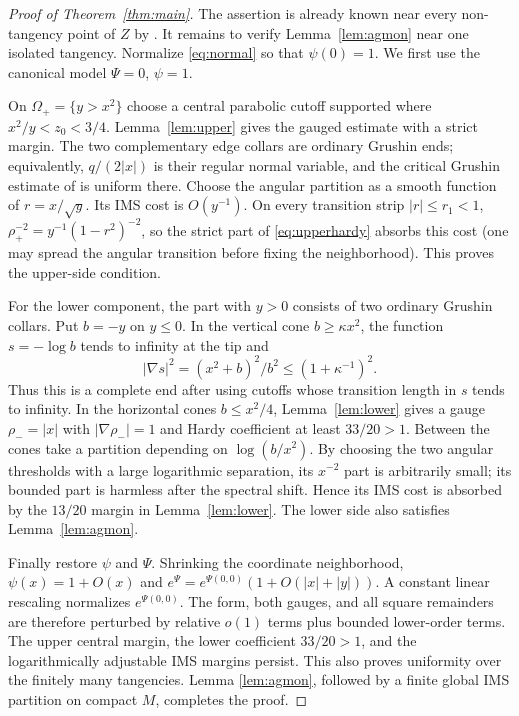\documentclass[11pt]{article}
\begin{document}
\begin{proof}[Proof of Theorem~\ref{thm:main}]
The assertion is already known near every non-tangency point of $Z$ by
\cite{BL,FPR}.  It remains to verify Lemma~\ref{lem:agmon} near one isolated
tangency.  Normalize \eqref{eq:normal} so that $\psi(0)=1$.  We first use the
canonical model $\Psi=0$, $\psi=1$.

On $\Omega_+=\{y>x^2\}$ choose a central parabolic cutoff supported where
$x^2/y<z_0<3/4$.  Lemma~\ref{lem:upper} gives the gauged estimate with a
strict margin.  The two complementary edge collars are ordinary Grushin
ends; equivalently, $q/(2|x|)$ is their regular normal variable, and the
critical Grushin estimate of \cite{BL,FPR} is uniform there.  Choose the
angular partition as a smooth function of $r=x/\sqrt y$.  Its IMS cost is
$O(y^{-1})$.  On every transition strip $|r|\le r_1<1$,
$\rho_+^{-2}=y^{-1}(1-r^2)^{-2}$, so the strict part of
\eqref{eq:upperhardy} absorbs this cost (one may spread the angular
transition before fixing the neighborhood).  This proves the upper-side
condition.

For the lower component, the part with $y>0$ consists of two ordinary
Grushin collars.  Put $b=-y$ on $y\le0$.  In the vertical cone
$b\ge\kappa x^2$, the function $s=-\log b$ tends to infinity at the tip and
\[
 |\nabla s|^2=(x^2+b)^2/b^2\le(1+\kappa^{-1})^2.
\]
Thus this is a complete end after using cutoffs whose transition length in
$s$ tends to infinity.  In the horizontal cones $b\le x^2/4$,
Lemma~\ref{lem:lower} gives a gauge $\rho_-=|x|$ with
$|\nabla\rho_-|=1$ and Hardy coefficient at least $33/20>1$.
Between the cones take a partition depending on
$\log(b/x^2)$.  By choosing the two angular thresholds with a large
logarithmic separation, its $x^{-2}$ part is arbitrarily small; its bounded
part is harmless after the spectral shift.  Hence its IMS cost is absorbed
by the $13/20$ margin in Lemma~\ref{lem:lower}.  The lower side also satisfies
Lemma~\ref{lem:agmon}.

Finally restore $\psi$ and $\Psi$.  Shrinking the coordinate neighborhood,
$\psi(x)=1+O(x)$ and $e^{\Psi}=e^{\Psi(0,0)}(1+O(|x|+|y|))$.  A constant
linear rescaling normalizes $e^{\Psi(0,0)}$.  The form, both gauges, and all
square remainders are therefore perturbed by relative $o(1)$ terms plus
bounded lower-order terms.  The upper central margin, the lower coefficient
$33/20>1$, and the logarithmically adjustable IMS margins persist.  This
also proves uniformity over the finitely many tangencies.  Lemma
\ref{lem:agmon}, followed by a finite global IMS partition on compact $M$,
completes the proof.
\end{proof}
\end{document}
